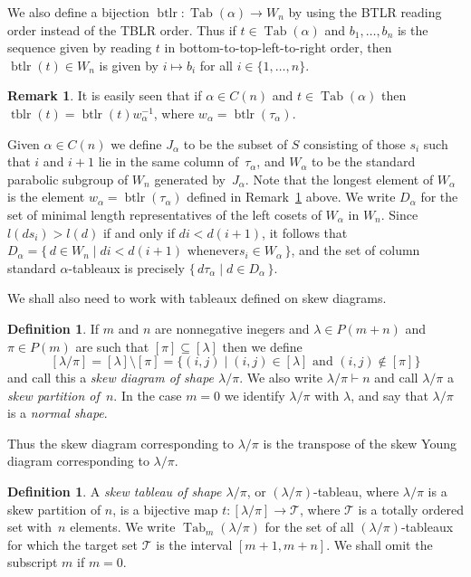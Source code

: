 \documentclass[10pt]{amsart}
\theoremstyle{definition}
\newtheorem{defi}[theo]{Definition}
\newtheorem{rema}[theo]{Remark}
\DeclareMathOperator{\perm}{tblr}
\DeclareMathOperator{\word}{btlr}
\DeclareMathOperator{\Tab}{Tab}
\begin{document}
We also define a bijection $\word\colon\Tab(\alpha)\to W_n$ by using the
BTLR reading order instead of the TBLR order. Thus if $t\in\Tab(\alpha)$
and $b_1,\ldots,b_n$ is the sequence given by reading $t$ in
bottom-to-top-left-to-right order, then $\word(t)\in W_n$ is given by
$i\mapsto b_i$ for all $i\in\{1,\ldots,n\}$.

\begin{rema}\label{readingword}
It is easily seen that if $\alpha\in C(n)$ and $t\in\Tab(\alpha)$ then
$\perm(t)=\word(t)w_\alpha^{-1}$, where $w_\alpha=\word(\tau_{\alpha})$.
\end{rema}

Given $\alpha\in C(n)$ we define $J_\alpha$ to be the subset
of $S$ consisting of those $s_i$ such that $i$ and $i+1$ lie in the same column
of~$\tau_\alpha$, and $W_\alpha$ to be the standard parabolic subgroup
of $W_n$ generated by~$J_\alpha$. Note that the longest element of
$W_\alpha$ is the element $w_{\alpha}=\word(\tau_{\alpha})$ defined in
Remark~\ref{readingword} above. We write
$D_{\alpha}$ for the set of minimal length representatives of the left
cosets of $W_{\alpha}$ in $W_n$. Since $l(ds_i)>l(d)$ if and
only if $di<d(i+1)$, it follows that
$D_{\alpha}=\{\,d\in W_n \mid di<d(i+1) \text{ whenever
$s_i\in W_{\alpha}$}\,\}$, and the set of column standard
$\alpha$-tableaux is precisely
$\{\,d\tau_{\alpha} \mid d\in D_{\alpha}\,\}$.

We shall also need to work with tableaux defined on skew diagrams.

\begin{defi}\label{skewpartition}\label{skewdiagram}
If $m$ and $n$ are nonnegative inegers and $\lambda\in P(m+n)$ and $\pi\in P(m)$
are such that $[\pi]\subseteq[\lambda]$ then we define
\[
[\lambda/\pi]=[\lambda]\setminus[\pi]=
\{(i,j)\mid (i,j)\in[\lambda] \text{ and } (i,j)\notin[\pi]\}
\]
and call this a \emph{skew diagram of shape $\lambda/\pi$}. We
also write $\lambda/\pi\vdash n$ and call $\lambda/\pi$ a
\emph{skew partition of~$n$}. In the case $m=0$ we identify
$\lambda/\pi$ with $\lambda$, and say that $\lambda/\pi$ is
a \emph{normal shape}.
\end{defi}

Thus the skew diagram corresponding to $\lambda/\pi$ is the
transpose of the skew Young diagram corresponding to $\lambda/\pi$.

\begin{defi}\label{skewtableau}
A \textit{skew tableau of shape $\lambda/\pi$}, or $(\lambda/\pi)$-tableau,
where $\lambda/\pi$ is a skew partition of $n$, is a bijective map
$t\colon[\lambda/\pi] \rightarrow\mathcal{T}$, where $\mathcal{T}$ is
a totally ordered set with~$n$ elements. We write $\Tab_m(\lambda/\pi)$
for the set of all $(\lambda/\pi)$-tableaux for which the target set
$\mathcal{T}$ is the interval $[m+1,m+n]$. We shall omit the subscript
$m$ if $m=0$.
\end{defi}
\end{document}
